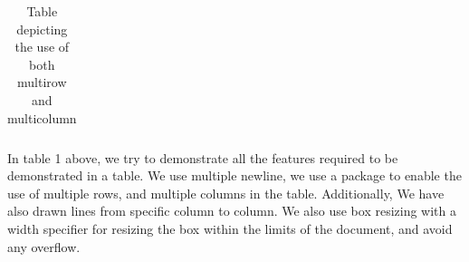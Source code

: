 \documentclass[english,12pt]{article}
\begin{document}
\begin{table}[H]
{{\begin{tabular}{|C{16mm}|C{7.5mm}|C{6.5mm}|C{6.5mm}|C{9mm}|C{7mm}|C{7mm}|C{6.5mm}|C{7mm}|C{9.5mm}|m{7mm}|}
\end{tabular}}}
\newline
\vspace*{-1.5mm}
{\fontsize{9}{11}\selectfont
\noindent{}}
\caption{Table depicting the use of both multirow and multicolumn}
\label{Table:1}
\end{table}
\begin{Large}
In table 1 above, we try to demonstrate all the features required to be demonstrated in a table. We use
multiple newline, we use a package to enable the use
of multiple rows, and multiple columns in the table.
Additionally, We have also drawn lines from specific
column to column. We also use box resizing with a
width specifier for resizing the box within the limits of
the document, and avoid any overflow.
\end{Large}
\newpage
\end{document}
